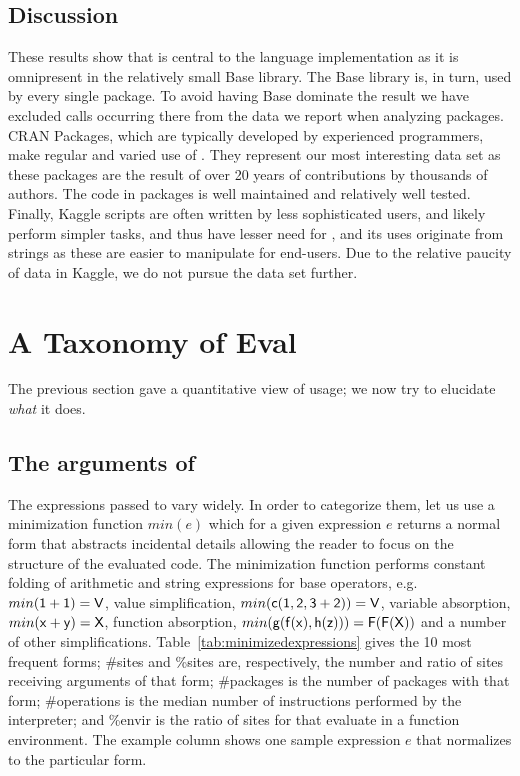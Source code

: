 \documentclass[review,nonacm,screen,acmsmall,anonymous=true]{acmart}
\begin{document}
\medskip

\subsection{Discussion}
These results show that \eval is central to the language implementation as it is
omnipresent in the relatively small Base library. The Base library is, in turn,
used by every single package. To avoid having Base dominate the result we have
excluded calls occurring there from the data we report when analyzing packages.
CRAN Packages, which are typically developed by experienced programmers, make
regular and varied use of \eval. They represent our most interesting data set as
these packages are the result of over 20 years of contributions by thousands of
authors. The code in packages is well maintained and relatively well tested.
Finally, Kaggle scripts are often written by less sophisticated users, and
likely perform simpler tasks, and thus have lesser need for \eval, and its uses
originate from strings as these are easier to manipulate for end-users. Due to
the relative paucity of data in Kaggle, we do not pursue the data set further.

\newpage
\section{A Taxonomy of Eval}

The previous section gave a quantitative view of \eval usage; we now try to
elucidate \emph{what} it does.

\subsection{The arguments of \eval}

The expressions passed to \eval vary widely. In order to categorize them, let us
use a minimization function $min(e)$ which for a given expression $e$ returns a
normal form that abstracts incidental details allowing the reader to focus on
the structure of the evaluated code. The minimization function performs constant
folding of arithmetic and string expressions for base operators, e.g.
$min({\sf 1+1})={\sf V}$, value simplification, $min({\sf c(1,2,3+2)})={\sf V}$,
variable absorption, $min({\sf x+y})={\sf X}$, function absorption,
$min({\sf g(f(x),h(z))})={\sf F(F(X))}$ and a number of other simplifications.
Table~\ref{tab:minimizedexpressions} gives the 10 most frequent forms; \#sites
and \%sites are, respectively, the number and ratio of sites receiving arguments
of that form; \#packages is the number of packages with that form; \#operations
is the median number of instructions performed by the interpreter; and \%envir
is the ratio of sites for that evaluate in a function environment. The example
column shows one sample expression $e$ that normalizes to the particular form.
\end{document}
